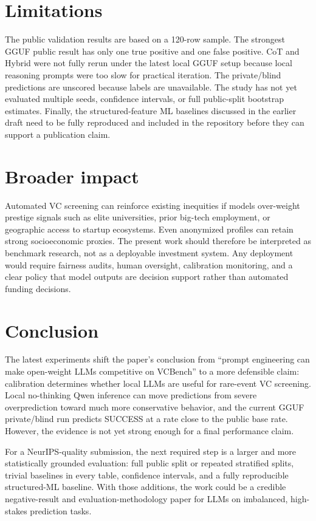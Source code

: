 \documentclass{article}
\begin{document}
\section{Limitations}

The public validation results are based on a 120-row sample. The strongest GGUF
public result has only one true positive and one false positive. CoT and Hybrid
were not fully rerun under the latest local GGUF setup because local reasoning
prompts were too slow for practical iteration. The private/blind predictions are
unscored because labels are unavailable. The study has not yet evaluated
multiple seeds, confidence intervals, or full public-split bootstrap estimates.
Finally, the structured-feature ML baselines discussed in the earlier draft need
to be fully reproduced and included in the repository before they can support a
publication claim.

\section{Broader impact}

Automated VC screening can reinforce existing inequities if models over-weight
prestige signals such as elite universities, prior big-tech employment, or
geographic access to startup ecosystems. Even anonymized profiles can retain
strong socioeconomic proxies. The present work should therefore be interpreted
as benchmark research, not as a deployable investment system. Any deployment
would require fairness audits, human oversight, calibration monitoring, and a
clear policy that model outputs are decision support rather than automated
funding decisions.

\section{Conclusion}

The latest experiments shift the paper's conclusion from ``prompt engineering
can make open-weight LLMs competitive on VCBench'' to a more defensible claim:
calibration determines whether local LLMs are useful for rare-event VC
screening. Local no-thinking Qwen inference can move predictions from severe
overprediction toward much more conservative behavior, and the current GGUF
private/blind run predicts SUCCESS at a rate close to the public base rate.
However, the evidence is not yet strong enough for a final performance claim.

For a NeurIPS-quality submission, the next required step is a larger and more
statistically grounded evaluation: full public split or repeated stratified
splits, trivial baselines in every table, confidence intervals, and a fully
reproducible structured-ML baseline. With those additions, the work could be a
credible negative-result and evaluation-methodology paper for LLMs on
imbalanced, high-stakes prediction tasks.
\end{document}

